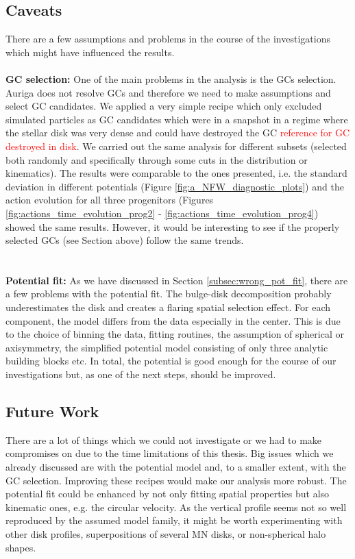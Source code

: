\subsection{Caveats}
There are a few assumptions and problems in the course of the investigations which might have influenced the results.
\\\\\textbf{GC selection:}
One of the main problems in the analysis is the \acp{GC} selection. Auriga does not resolve \acp{GC} and therefore we need to make assumptions and select \ac{GC} candidates. We applied a very simple recipe which only excluded simulated particles as \ac{GC} candidates which were in a snapshot in a regime where the stellar disk was very dense and could have destroyed the \ac{GC} \textcolor{red}{reference for GC destroyed in disk}. We carried out the same analysis for different subsets (selected both randomly and specifically through some cuts in the distribution or kinematics). The results were comparable to the ones presented, i.e. the standard deviation in different potentials (Figure \ref{fig:a_NFW_diagnostic_plots}) and the action evolution for all three progenitors (Figures \ref{fig:actions_time_evolution_prog2} - \ref{fig:actions_time_evolution_prog4}) showed the same results. However, it would be interesting to see if the properly selected \acp{GC} (see Section above) follow the same trends.\\
\\\\\textbf{Potential fit:}
As we have discussed in Section \ref{subsec:wrong_pot_fit}, there are a few problems with the potential fit. The bulge-disk decomposition probably underestimates the disk and creates a flaring spatial selection effect. For each component, the model differs from the data especially in the center. This is due to the choice of binning the data, fitting routines, the assumption of spherical or axisymmetry, the simplified potential model consisting of only three analytic building blocks etc. In total, the potential is good enough for the course of our investigations but, as one of the next steps, should be improved.

\subsection{Future Work}
There are a lot of things which we could not investigate or we had to make compromises on due to the time limitations of this thesis. Big issues which we already discussed are with the potential model and, to a smaller extent, with the \ac{GC} selection. Improving these recipes would make our analysis more robust. The potential fit could be enhanced by not only fitting spatial properties but also kinematic ones, e.g. the circular velocity. As the vertical profile seems not so well reproduced by the assumed model family, it might be worth experimenting with other disk profiles, superpositions of several \ac{MN} disks, or non-spherical halo shapes.

